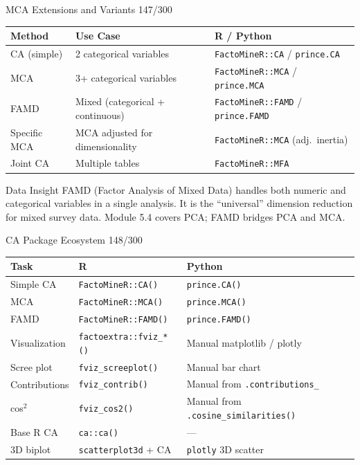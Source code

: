 \documentclass[10pt]{beamer}
\newcommand{\smark}[1]{\hfill{\scriptsize\color{codegray}#1}}
\begin{document}
\begin{frame}{MCA Extensions and Variants}
\smark{147/300}
\centering\small
\begin{tabular}{@{}lll@{}}
    \toprule
    \textbf{Method} & \textbf{Use Case} & \textbf{R / Python} \\
    \midrule
    CA (simple)   & 2 categorical variables        & \texttt{FactoMineR::CA} / \texttt{prince.CA} \\
    MCA           & 3+ categorical variables       & \texttt{FactoMineR::MCA} / \texttt{prince.MCA} \\
    FAMD          & Mixed (categorical + continuous)& \texttt{FactoMineR::FAMD} / \texttt{prince.FAMD} \\
    Specific MCA  & MCA adjusted for dimensionality& \texttt{FactoMineR::MCA} (adj.\ inertia) \\
    Joint CA      & Multiple tables                & \texttt{FactoMineR::MFA} \\
    \bottomrule
\end{tabular}

\vspace{0.3cm}
\begin{exampleblock}{Data Insight}
    \scriptsize FAMD (Factor Analysis of Mixed Data) handles both numeric and categorical variables in a single analysis. It is the ``universal'' dimension reduction for mixed survey data. Module 5.4 covers PCA; FAMD bridges PCA and MCA.
\end{exampleblock}
\end{frame}

\begin{frame}{CA Package Ecosystem}
\smark{148/300}
\centering\small
\begin{tabular}{@{}lll@{}}
    \toprule
    \textbf{Task} & \textbf{R} & \textbf{Python} \\
    \midrule
    Simple CA          & \texttt{FactoMineR::CA()}        & \texttt{prince.CA()} \\
    MCA                & \texttt{FactoMineR::MCA()}       & \texttt{prince.MCA()} \\
    FAMD               & \texttt{FactoMineR::FAMD()}      & \texttt{prince.FAMD()} \\
    Visualization      & \texttt{factoextra::fviz\_*()}   & Manual matplotlib / plotly \\
    Scree plot         & \texttt{fviz\_screeplot()}       & Manual bar chart \\
    Contributions      & \texttt{fviz\_contrib()}         & Manual from \texttt{.contributions\_} \\
    cos$^2$            & \texttt{fviz\_cos2()}            & Manual from \texttt{.cosine\_similarities()} \\
    Base R CA          & \texttt{ca::ca()}                & --- \\
    3D biplot          & \texttt{scatterplot3d} + CA      & \texttt{plotly} 3D scatter \\
    \bottomrule
\end{tabular}
\end{frame}
\end{document}
